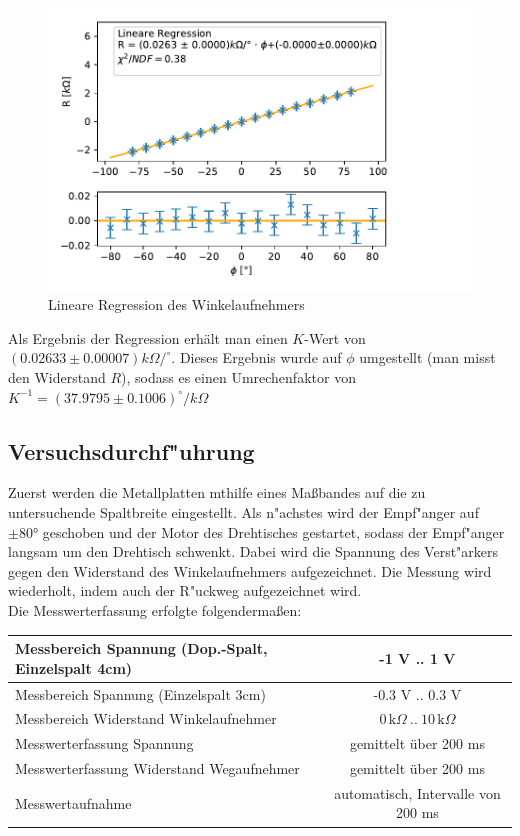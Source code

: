\documentclass[12pt,a4paper]{article}
\begin{document}
\begin{figure}[H]
	\centering
	\includegraphics[width=0.7\linewidth]{Rohdaten/Images/Winkelkalib}
	\caption{Lineare Regression des Winkelaufnehmers}
	\label{fig:winkelkalib}
\end{figure}

Als Ergebnis der Regression erhält man einen $K$-Wert von $(0.02633\pm0.00007)k\Omega/^\circ$. Dieses Ergebnis wurde auf $\phi$ umgestellt (man misst den Widerstand $R$), sodass es einen Umrechenfaktor von $K^{-1} =(37.9795\pm0.1006)^\circ/k\Omega$


\subsection{Versuchsdurchf"uhrung}
Zuerst werden die Metallplatten mthilfe eines Ma\ss bandes auf die zu untersuchende Spaltbreite eingestellt.
Als n"achstes wird der Empf"anger auf $\pm\ang{80}$ geschoben und der Motor des Drehtisches gestartet, sodass der Empf"anger langsam um den Drehtisch schwenkt. Dabei wird die Spannung des Verst"arkers gegen den Widerstand des Winkelaufnehmers aufgezeichnet. Die Messung wird wiederholt, indem auch der R"uckweg aufgezeichnet wird.\\
Die Messwerterfassung erfolgte folgenderma\ss en:
\begin{table}[H]
	\centering
	\begin{tabular}{|l|c|}
		\hline 
		Messbereich Spannung (Dop.-Spalt, Einzelspalt 4cm)  & -1 V .. 1 V \\ 
		\hline 
		Messbereich Spannung (Einzelspalt 3cm)  & -0.3 V .. 0.3 V \\ 
		\hline 
		Messbereich Widerstand Winkelaufnehmer & $0\,\text{k}\Omega\ ..\ 10\,\text{k}\Omega$\\ 
		\hline 
		Messwerterfassung Spannung & gemittelt über 200 ms \\ 
		\hline
		Messwerterfassung Widerstand Wegaufnehmer & gemittelt über 200 ms \\ 
		\hline 
		Messwertaufnahme & automatisch, Intervalle von 200 ms \\ 
		\hline 

	\end{tabular} 
	\label{tab:MessparameterAllgemein}
\end{table}
\end{document}
